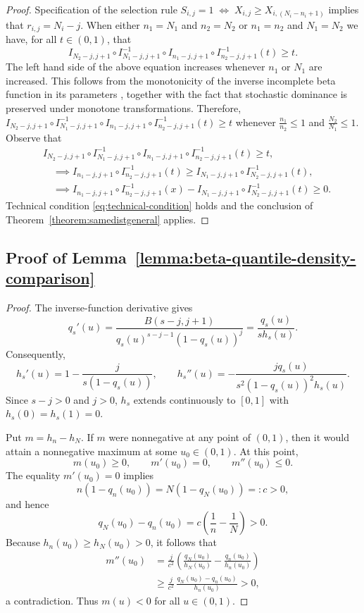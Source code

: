 \documentclass[12pt]{article}
\begin{document}
\begin{proof}
Specification of the selection rule $S_{i,j} = 1 \;\Longleftrightarrow\; X_{i,j} \geq X_{i,(N_i - n_i + 1)}$ implies that $r_{i,j} = N_i - j$. When either $n_1 = N_1$ and $n_2 = N_2$ or $n_1 = n_2$ and $N_1 = N_2$ we have, for all $t \in (0,1)$, that
$$
  I_{N_2-j,j+1} \circ I_{N_1-j,j+1}^{-1} \circ I_{n_1-j,j+1} \circ I_{n_2-j,j+1}^{-1} (t) \geq t.
$$
The left hand side of the above equation increases whenever $n_1$ or $N_1$ are increased. This follows from the monotonicity of the inverse incomplete beta function in its parameters \citep{askitis2021logarithmic}, together with the fact that stochastic dominance is preserved under monotone transformations. Therefore,
$
  I_{N_2-j,j+1} \circ I_{N_1-j,j+1}^{-1} \circ I_{n_1-j,j+1} \circ I_{n_2-j,j+1}^{-1} (t) \geq t
$
whenever $\frac{n_1}{n_2}\leq 1$ and $\frac{N_2}{N_1} \leq 1$. Observe that
\begin{align*}
&I_{N_2-j,j+1} \circ I_{N_1-j,j+1}^{-1} \circ I_{n_1-j,j+1} \circ I_{n_2-j,j+1}^{-1} (t) \geq t, \\ 
&\quad\implies I_{n_1-j,j+1} \circ I_{n_2-j,j+1}^{-1} (t) \geq I_{N_1-j,j+1} \circ I_{N_2-j,j+1}^{-1}(t),   \\
&\quad\implies I_{n_1-j,j+1} \circ I_{n_2-j,j+1}^{-1} (x) - I_{N_1-j,j+1} \circ I_{N_2-j,j+1}^{-1}(t) \geq 0.
\end{align*}
Technical condition \eqref{eq:technical-condition} holds and the conclusion of Theorem~\ref{theorem:samedistgeneral} applies.
\end{proof}

\subsection{Proof of Lemma~\ref{lemma:beta-quantile-density-comparison}}

\begin{proof}
The inverse-function derivative gives
\[
 q_s'(u)
 =\frac{B(s-j,j+1)}{q_s(u)^{s-j-1}(1-q_s(u))^j}
 =\frac{q_s(u)}{s h_s(u)}.
\]
Consequently,
\[
 h_s'(u)=1-\frac{j}{s(1-q_s(u))},
 \qquad
 h_s''(u)=-\frac{j q_s(u)}{s^2(1-q_s(u))^2h_s(u)}.
\]
Since $s-j>0$ and $j>0$, $h_s$ extends continuously to $[0,1]$
with $h_s(0)=h_s(1)=0$.

Put $m=h_n-h_N$. If $m$ were nonnegative at any point of $(0,1)$,
then it would attain a nonnegative maximum at some $u_0\in(0,1)$.
At this point,
\[
 m(u_0)\geq0,\qquad m'(u_0)=0,\qquad m''(u_0)\leq0.
\]
The equality $m'(u_0)=0$ implies
\[
 n(1-q_n(u_0))=N(1-q_N(u_0))=:c>0,
\]
and hence
\[
 q_N(u_0)-q_n(u_0)=c\left(\frac1n-\frac1N\right)>0.
\]
Because $h_n(u_0)\geq h_N(u_0)>0$, it follows that
\begin{align*}
 m''(u_0)
 &=\frac{j}{c^2}\left(
   \frac{q_N(u_0)}{h_N(u_0)}-
   \frac{q_n(u_0)}{h_n(u_0)}\right)\\
 &\geq\frac{j}{c^2}\,
   \frac{q_N(u_0)-q_n(u_0)}{h_n(u_0)}>0,
\end{align*}
a contradiction. Thus $m(u)<0$ for all $u\in(0,1)$.
\end{proof}
\end{document}
